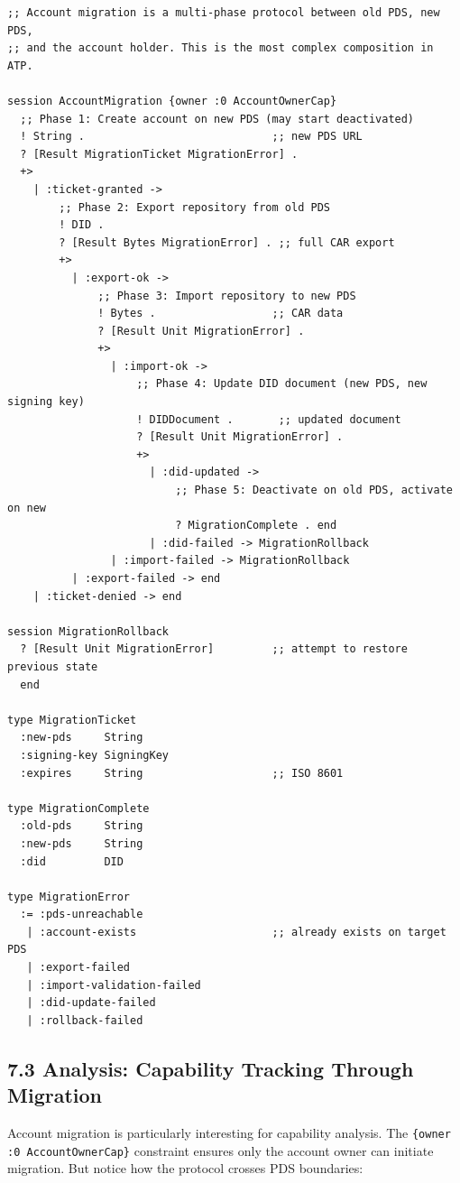 \documentclass[11pt]{article}
\begin{document}
\begin{verbatim}
;; Account migration is a multi-phase protocol between old PDS, new PDS,
;; and the account holder. This is the most complex composition in ATP.

session AccountMigration {owner :0 AccountOwnerCap}
  ;; Phase 1: Create account on new PDS (may start deactivated)
  ! String .                             ;; new PDS URL
  ? [Result MigrationTicket MigrationError] .
  +>
    | :ticket-granted ->
        ;; Phase 2: Export repository from old PDS
        ! DID .
        ? [Result Bytes MigrationError] . ;; full CAR export
        +>
          | :export-ok ->
              ;; Phase 3: Import repository to new PDS
              ! Bytes .                  ;; CAR data
              ? [Result Unit MigrationError] .
              +>
                | :import-ok ->
                    ;; Phase 4: Update DID document (new PDS, new signing key)
                    ! DIDDocument .       ;; updated document
                    ? [Result Unit MigrationError] .
                    +>
                      | :did-updated ->
                          ;; Phase 5: Deactivate on old PDS, activate on new
                          ? MigrationComplete . end
                      | :did-failed -> MigrationRollback
                | :import-failed -> MigrationRollback
          | :export-failed -> end
    | :ticket-denied -> end

session MigrationRollback
  ? [Result Unit MigrationError]         ;; attempt to restore previous state
  end

type MigrationTicket
  :new-pds     String
  :signing-key SigningKey
  :expires     String                    ;; ISO 8601

type MigrationComplete
  :old-pds     String
  :new-pds     String
  :did         DID

type MigrationError
  := :pds-unreachable
   | :account-exists                     ;; already exists on target PDS
   | :export-failed
   | :import-validation-failed
   | :did-update-failed
   | :rollback-failed
\end{verbatim}
\subsection{7.3 Analysis: Capability Tracking Through Migration}
\label{sec:org4679262}

Account migration is particularly interesting for capability analysis.
The \texttt{\{owner :0 AccountOwnerCap\}} constraint ensures only the account owner
can initiate migration. But notice how the protocol crosses PDS boundaries:
\end{document}
